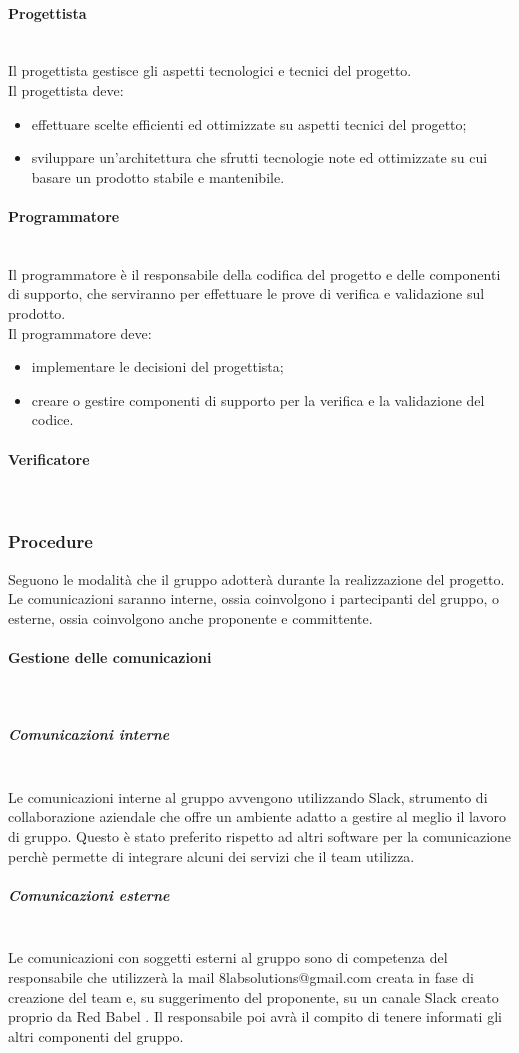 			\paragraph{Progettista} \mbox{}\\
			Il progettista gestisce gli aspetti tecnologici e tecnici del progetto.\\
			Il progettista deve:
			\begin{itemize}
				\item effettuare scelte efficienti ed ottimizzate su aspetti tecnici del progetto;
				\item sviluppare un'architettura che sfrutti tecnologie note ed ottimizzate su cui basare un prodotto stabile e mantenibile.
			\end{itemize}
			\paragraph{Programmatore} \mbox{}\\
			Il programmatore è il responsabile della codifica del progetto e delle componenti di supporto, che serviranno per effettuare le prove di verifica e validazione sul prodotto.\\
			Il programmatore deve:
			\begin{itemize}
				\item implementare le decisioni del progettista;
				\item creare o gestire componenti di supporto per la verifica e la validazione del codice.
			\end{itemize}
			\paragraph{Verificatore} \mbox{}\\
		\subsubsection{Procedure}
		Seguono le modalità che il gruppo adotterà durante la realizzazione del progetto. Le comunicazioni saranno interne, ossia coinvolgono i partecipanti del gruppo, o esterne, ossia coinvolgono anche proponente e committente.
			\paragraph{Gestione delle comunicazioni} \mbox{}\\
			\subparagraph{Comunicazioni interne} \mbox{}\\
			Le comunicazioni interne al gruppo avvengono utilizzando Slack, strumento di collaborazione aziendale che offre un ambiente adatto a gestire al meglio il lavoro di gruppo. Questo è stato preferito rispetto ad altri software per la comunicazione perchè permette di integrare alcuni dei servizi che il team utilizza.
			\subparagraph{Comunicazioni esterne} \mbox{}\\
				Le comunicazioni con soggetti esterni al gruppo sono di competenza del responsabile che utilizzerà la mail 8labsolutions@gmail.com creata in fase di creazione del team e, su suggerimento del proponente, su un canale Slack creato proprio da Red Babel .  Il responsabile poi avrà il compito di tenere informati gli altri componenti del gruppo.
